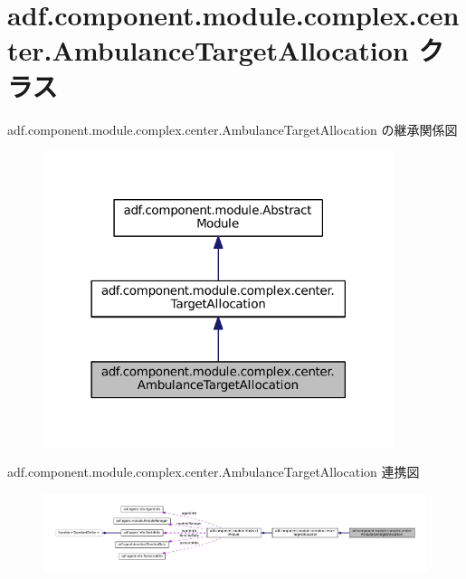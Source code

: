 \hypertarget{classadf_1_1component_1_1module_1_1complex_1_1center_1_1AmbulanceTargetAllocation}{}\section{adf.\+component.\+module.\+complex.\+center.\+Ambulance\+Target\+Allocation クラス}
\label{classadf_1_1component_1_1module_1_1complex_1_1center_1_1AmbulanceTargetAllocation}


adf.\+component.\+module.\+complex.\+center.\+Ambulance\+Target\+Allocation の継承関係図
\nopagebreak
\begin{figure}[H]
\begin{center}
\leavevmode
\includegraphics[width=290pt]{classadf_1_1component_1_1module_1_1complex_1_1center_1_1AmbulanceTargetAllocation__inherit__graph}
\end{center}
\end{figure}


adf.\+component.\+module.\+complex.\+center.\+Ambulance\+Target\+Allocation 連携図
\nopagebreak
\begin{figure}[H]
\begin{center}
\leavevmode
\includegraphics[width=350pt]{classadf_1_1component_1_1module_1_1complex_1_1center_1_1AmbulanceTargetAllocation__coll__graph}
\end{center}
\end{figure}
